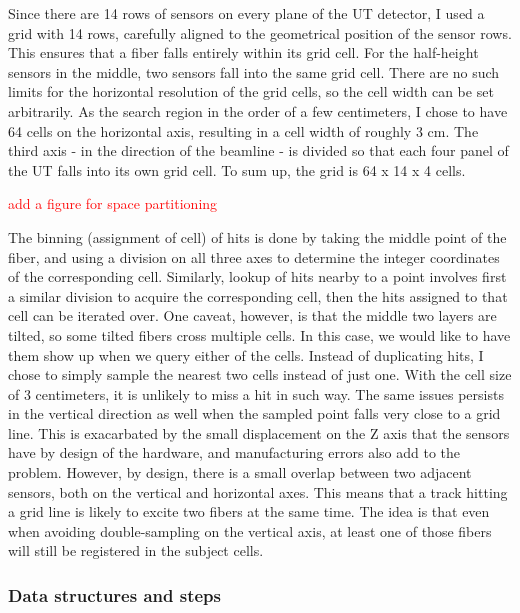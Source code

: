 \documentclass[12pt]{article}
\begin{document}
Since there are 14  rows of sensors on every plane of the UT detector, I used a grid with 14 rows, carefully aligned to the geometrical position of the sensor rows. This ensures that a fiber falls entirely within its grid cell. For the half-height sensors in the middle, two sensors fall into the same grid cell. There are no such limits for the horizontal resolution of the grid cells, so the cell width can be set arbitrarily. As the search region in the order of a few centimeters, I chose to have 64 cells on the horizontal axis, resulting in a cell width of roughly 3 cm. The third axis - in the direction of the beamline - is divided so that each four panel of the UT falls into its own grid cell. To sum up, the grid is 64 x 14 x 4 cells.
\vspace{1pc}

\textcolor{red}{add a figure for space partitioning}

The binning (assignment of cell) of hits is done by taking the middle point of the fiber, and using a division on all three axes to determine the integer coordinates of the corresponding cell.
Similarly, lookup of hits nearby to a point involves first a similar division to acquire the corresponding cell, then the hits assigned to that cell can be iterated over. One caveat, however, is that the middle two layers are tilted, so some tilted fibers cross multiple cells. In this case, we would like to have them show up when we query either of the cells. Instead of duplicating hits, I chose to simply sample the nearest two cells instead of just one. With the cell size of 3 centimeters, it is unlikely to miss a hit in such way. The same issues persists in the vertical direction as well when the sampled point falls very close to a grid line. This is exacarbated by the small displacement on the Z axis that the sensors have by design of the hardware, and manufacturing errors also add to the problem. However, by design, there is a small overlap between two adjacent sensors, both on the vertical and horizontal axes. This means that a track hitting a grid line is likely to excite two fibers at the same time. The idea is that even when avoiding double-sampling on the vertical axis, at least one of those fibers will still be registered in the subject cells.


\subsubsection{Data structures and steps}
\end{document}
